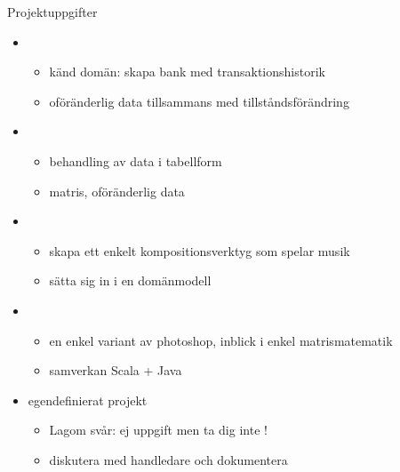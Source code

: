 \begin{SlideExtra}{Projektuppgifter}\SlideFontTiny

\begin{itemize}\SlideFontTiny
\item {}
\begin{itemize}\SlideFontTiny
\item känd domän: skapa bank med transaktionshistorik 
\item oföränderlig data tillsammans med tillståndsförändring
\end{itemize}

\item {}
\begin{itemize}\SlideFontTiny
\item behandling av data i tabellform 
\item matris, oföränderlig data
\end{itemize}

\item {}
\begin{itemize}\SlideFontTiny
\item skapa ett enkelt kompositionsverktyg som spelar musik
\item sätta sig in i en domänmodell
\end{itemize}

\item {} 
\begin{itemize}\SlideFontTiny
\item en enkel variant av photoshop, inblick i enkel matrismatematik
\item samverkan Scala + Java
\end{itemize}


\item egendefinierat projekt 
\begin{itemize}\SlideFontTiny
\item Lagom svår: ej  uppgift men ta dig inte !
\item diskutera med handledare och dokumentera
\end{itemize}


\end{itemize}

\end{SlideExtra}



